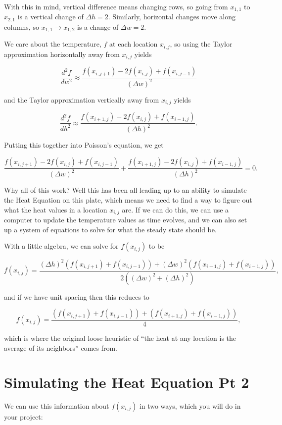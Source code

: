\documentclass{ximera}
\begin{document}
With this in mind, vertical difference means changing rows, so going from $x_{1,1}$ to $x_{2,1}$ is a vertical change of $\Delta h=2$. Similarly, horizontal changes move along columns, so $x_{1,1}\rightarrow x_{1,2}$ is a change of $\Delta w=2$.

We care about the temperature, $f$ at each location $x_{i,j}$, so using the Taylor approximation horizontally away from $x_{i,j}$ yields

$$\frac{d^2f}{dw^2}\approx \frac{f(x_{i,j+1})-2f(x_{i,j})+f(x_{i,j-1})}{\left(\Delta w\right)^2}$$

and the Taylor approximation vertically away from $x_{i,j}$ yields

$$\frac{d^2f}{dh^2}\approx \frac{f(x_{i+1,j})-2f(x_{i,j})+f(x_{i-1,j})}{\left(\Delta h\right)^2}.$$

Putting this together into Poisson's equation, we get

$$\frac{f(x_{i,j+1})-2f(x_{i,j})+f(x_{i,j-1})}{\left(\Delta w\right)^2}+\frac{f(x_{i+1,j})-2f(x_{i,j})+f(x_{i-1,j})}{\left(\Delta h\right)^2}=0.$$

Why all of this work? Well this has been all leading up to an ability to simulate the Heat Equation on this plate, which means we need to find a way to figure out what the heat values in a location $x_{i,j}$ are. If we can do this, we can use a computer to update the temperature values as time evolves, and we can also set up a system of equations to solve for what the steady state should be. 

With a little algebra, we can solve for $f(x_{i,j})$ to be

$$f(x_{i,j})=\frac{\left(\Delta h\right)^2(f(x_{i,j+1})+f(x_{i,j-1}))+\left(\Delta w\right)^2(f(x_{i+1,j})+f(x_{i-1,j}))}{2(\left(\Delta w\right)^2+\left(\Delta h\right)^2)},$$

and if we have unit spacing then this reduces to 

$$f(x_{i,j})=\frac{(f(x_{i,j+1})+f(x_{i,j-1}))+(f(x_{i+1,j})+f(x_{i-1,j}))}{4},$$

which is where the original loose heuristic of ``the heat at any location is the average of its neighbors'' comes from.

\section{Simulating the Heat Equation Pt 2}

We can use this information about $f(x_{i,j})$ in two ways, which you will do in your project:
\end{document}
